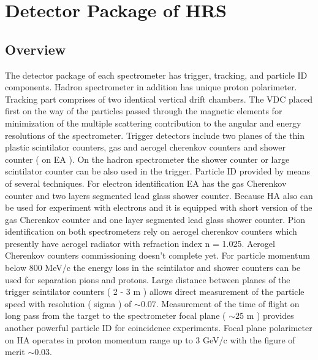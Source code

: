 \documentclass[12pt]{article}
\begin{document}
\section{Detector Package of HRS}
\subsection{Overview}

The detector package of each spectrometer has trigger, tracking, and particle 
ID components. Hadron spectrometer in addition has unique proton polarimeter.
Tracking part comprises of two identical vertical drift chambers. The VDC
placed first on the way of the particles passed through the magnetic 
elements for minimization of the multiple scattering contribution to the angular and 
energy resolutions of the spectrometer. Trigger detectors include two planes of the
thin plastic scintilator counters, gas and aerogel cherenkov counters and shower 
counter ( on EA ). On the hadron spectrometer the shower counter or large scintilator counter 
can be also used in the trigger. Particle ID provided by means of several techniques. 
For electron identification EA has the gas Cherenkov counter and two layers segmented 
lead glass shower counter. Because HA also can be used for experiment with electrons 
and it is equipped with short version of the gas Cherenkov counter and one layer segmented 
lead glass shower counter. Pion identification on both spectrometers rely on aerogel 
cherenkov counters which presently have aerogel radiator with refraction index n = 1.025. 
Aerogel Cherenkov counters commissioning doesn't complete yet. For particle momentum  
below 800 MeV/c the energy loss in the scintilator and shower counters can be used for 
separation pions and protons. Large distance between planes of the trigger scintilator 
counters ( 2 - 3 m ) allows direct measurement of the particle speed with resolution ( sigma )
of $\sim 0.07$. Measurement of the time of flight on long pass from the target to the 
spectrometer focal plane ( $\sim 25$ m ) provides another powerful particle ID for 
coincidence experiments.
Focal plane polarimeter on HA operates in proton momentum range up to 3 GeV/c with 
the figure of merit $\sim 0.03$.\\
\end{document}
